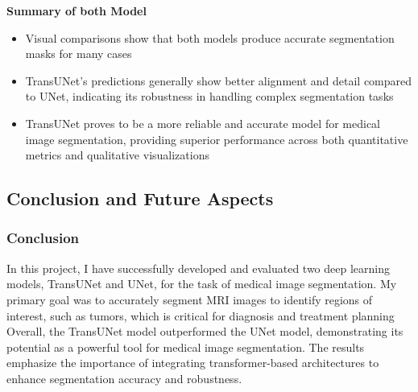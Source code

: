 \documentclass[11pt,a4paper]{article}
\begin{document}
\vspace{0.6cm}
\textbf{Summary of both Model}
\begin{itemize}
    \item Visual comparisons show that both models produce accurate segmentation masks for many cases
    \item TransUNet's predictions generally show better alignment and detail compared to UNet, indicating its robustness in handling complex segmentation tasks
    \item TransUNet proves to be a more reliable and accurate model for medical image segmentation, providing superior performance across both quantitative metrics and qualitative visualizations

\end{itemize}
\pagebreak

\subsection{Conclusion and Future Aspects}
\subsubsection{Conclusion}
In this project, I have successfully developed and evaluated two deep learning models, TransUNet and UNet, for the task of medical image segmentation. My primary goal was to accurately segment MRI images to identify regions of interest, such as tumors, which is critical for diagnosis and treatment planning
\vspace{0.3cm}
\linebreak
Overall, the TransUNet model outperformed the UNet model, demonstrating its potential as a powerful tool for medical image segmentation. The results emphasize the importance of integrating transformer-based architectures to enhance segmentation accuracy and robustness.
\vspace{0.6cm}
\end{document}
